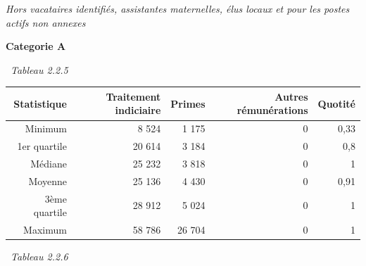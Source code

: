 \emph{Hors vacataires identifiés, assistantes maternelles, élus locaux
et pour les postes actifs non annexes}

\textbf{Categorie A}

~\emph{Tableau 2.2.5}

\begin{longtable}[]{@{}rrrrr@{}}
\toprule
Statistique & Traitement indiciaire & Primes & Autres rémunérations &
Quotité\tabularnewline
\midrule
\endhead
Minimum & 8 524 & 1 175 & 0 & 0,33\tabularnewline
1er quartile & 20 614 & 3 184 & 0 & 0,8\tabularnewline
Médiane & 25 232 & 3 818 & 0 & 1\tabularnewline
Moyenne & 25 136 & 4 430 & 0 & 0,91\tabularnewline
3ème quartile & 28 912 & 5 024 & 0 & 1\tabularnewline
Maximum & 58 786 & 26 704 & 0 & 1\tabularnewline
\bottomrule
\end{longtable}

~\emph{Tableau 2.2.6}

